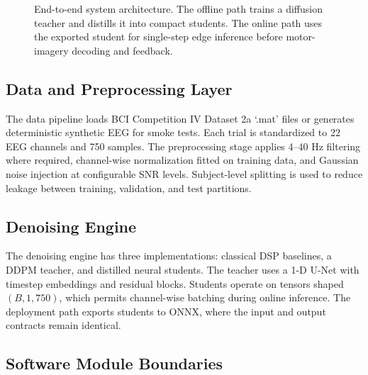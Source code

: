 \documentclass[11pt]{article}
\begin{document}
\begin{figure}[H]
{
    }
    \caption{End-to-end system architecture. The offline path trains a diffusion teacher and distills it into compact students. The online path uses the exported student for single-step edge inference before motor-imagery decoding and feedback.}
    \label{fig:architecture}
\end{figure}

\subsection{Data and Preprocessing Layer}

The data pipeline loads BCI Competition IV Dataset 2a `.mat' files or generates deterministic synthetic EEG for smoke tests. Each trial is standardized to 22 EEG channels and 750 samples. The preprocessing stage applies 4--40 Hz filtering where required, channel-wise normalization fitted on training data, and Gaussian noise injection at configurable SNR levels. Subject-level splitting is used to reduce leakage between training, validation, and test partitions.

\subsection{Denoising Engine}

The denoising engine has three implementations: classical DSP baselines, a DDPM teacher, and distilled neural students. The teacher uses a 1-D U-Net with timestep embeddings and residual blocks. Students operate on tensors shaped \((B,1,750)\), which permits channel-wise batching during online inference. The deployment path exports students to ONNX, where the input and output contracts remain identical.

\subsection{Software Module Boundaries}
\end{document}
